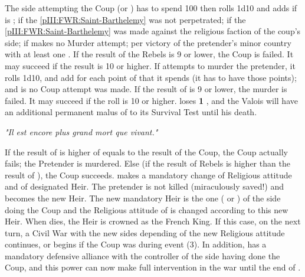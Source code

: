 \begin{digressions}
  \phpaix
  \aparag The side attempting the Coup (\LIG or \HUG) has to spend 100\ducats
  then rolls 1d10 and adds  if \FRA is \CATHCO;  if the
  \ref{pIII:FWR:Saint-Barthelemy} was not perpetrated;  if the
  \ref{pIII:FWR:Saint-Barthelemy} was made against the religious faction of
  the coup's side;  if \FRA makes no Murder attempt;  per
  victory of the pretender's minor country with at least one \ARMY \faceplus.
   If the result of the Rebels is 9 or lower, the
  Coup is failed. It may succeed if the result is 10 or higher.
  \aparag If \FRA attempts to murder the pretender, it rolls 1d10, and add
   for each point of \STAB that it spends (it has to have those
  points); and  is no Coup attempt was made.
   If the result of \FRA is 9 or lower, the
  murder is failed. It may succeed if the roll is 10 or higher.  \FRA loses
  {\bf 1} \STAB, and the Valois  will have
  an additional permanent malus of  to its Survival Test until his
  death. \\
  \centerline{\textit{"Il est encore plus grand mort que vivant."}}
  \bparag If the result of \FRA is higher of equals to the result of the Coup,
  the Coup actually fails; the Pretender is murdered.
  \bparag Else (if the result of Rebels is higher than the result of \FRA),
  the Coup succeeds. \FRA makes a mandatory change of Religious attitude and
  of designated Heir. The pretender is not killed (miraculously saved!) and
  becomes the new Heir.
  \bparag The new mandatory Heir is the one ( or
  ) of the side doing the Coup and the Religious
  attitude of \FRA is changed according to this new Heir.
  \bparag When  dies, the Heir is crowned as the French
  King.
  \bparag If this case, on the next turn, a Civil War with the new sides
  depending of the new Religious attitude continues, or begins if the Coup was
  during event (3).
  \aparag In addition, \FRA has a mandatory defensive alliance with the
  controller of the side having done the Coup, and this power can now make
  full intervention in the war until the end of .




\end{digressions}
